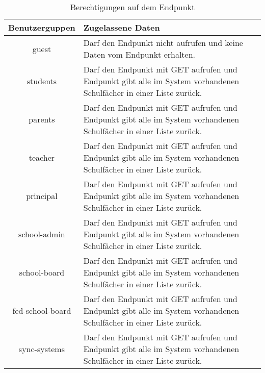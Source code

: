 \begin{table}[!htb]
	\begin{tabularx}{\textwidth}{|c|X|}
		\hline
\textbf{Benutzerguppen} & \textbf{Zugelassene Daten} \\ \hline
\endhead
guest & Darf den Endpunkt nicht aufrufen und keine Daten vom Endpunkt erhalten. \\ \hline
students  & Darf den Endpunkt mit GET aufrufen und Endpunkt gibt alle im System vorhandenen Schulfächer in einer Liste zurück. \\ \hline
parents & Darf den Endpunkt mit GET aufrufen und Endpunkt gibt alle im System vorhandenen Schulfächer in einer Liste zurück. \\ \hline
teacher & Darf den Endpunkt mit GET aufrufen und Endpunkt gibt alle im System vorhandenen Schulfächer in einer Liste zurück. \\ \hline
principal & Darf den Endpunkt mit GET aufrufen und Endpunkt gibt alle im System vorhandenen Schulfächer in einer Liste zurück. \\ \hline
school-admin & Darf den Endpunkt mit GET aufrufen und Endpunkt gibt alle im System vorhandenen Schulfächer in einer Liste zurück. \\ \hline
school-board & Darf den Endpunkt mit GET aufrufen und Endpunkt gibt alle im System vorhandenen Schulfächer in einer Liste zurück. \\ \hline
fed-school-board & Darf den Endpunkt mit GET aufrufen und Endpunkt gibt alle im System vorhandenen Schulfächer in einer Liste zurück. \\ \hline
sync-systems & Darf den Endpunkt mit GET aufrufen und Endpunkt gibt alle im System vorhandenen Schulfächer in einer Liste zurück. \\ \hline

	\end{tabularx}

		\caption{Berechtigungen auf dem Endpunkt}
		\label{tab:end:rest:api:school-subjects:get:right}
\end{table}